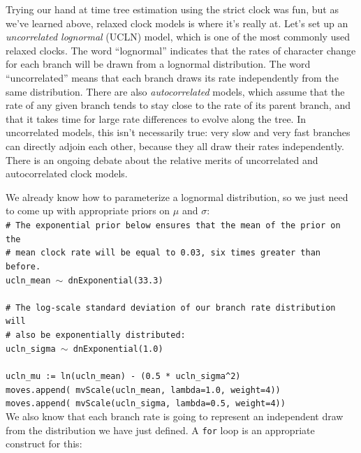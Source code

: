 \documentclass[12pt]{article}
\begin{document}
Trying our hand at time tree estimation using the strict clock was fun, but as we've learned above, relaxed clock models is where it's really at. Let's set up an \textit{uncorrelated lognormal} (UCLN) model, which is one of the most commonly used relaxed clocks. The word ``lognormal'' indicates that the rates of character change for each branch will be drawn from a lognormal distribution. The word ``uncorrelated'' means that each branch draws its rate independently from the same distribution. There are also \textit{autocorrelated} models, which assume that the rate of any given branch tends to stay close to the rate of its parent branch, and that it takes time for large rate differences to evolve along the tree. In uncorrelated models, this isn't necessarily true: very slow and very fast branches can directly adjoin each other, because they all draw their rates independently. There is an ongoing debate about the relative merits of uncorrelated and autocorrelated clock models.

\noindent We already know how to parameterize a lognormal distribution, so we just need to come up with appropriate priors on $\mu$ and $\sigma$: \\

\indent \texttt{\# The exponential prior below ensures that the mean of the prior on the} \\
\indent \texttt{\# mean clock rate will be equal to 0.03, six times greater than before.} \\
\indent \texttt{ucln\_mean {\footnotesize $\sim$} dnExponential(33.3)} \\
\ \\
\indent \texttt{\# The log-scale standard deviation of our branch rate distribution will} \\
\indent \texttt{\# also be exponentially distributed:} \\
\indent \texttt{ucln\_sigma {\footnotesize $\sim$} dnExponential(1.0)} \\
\ \\
\indent \texttt{ucln\_mu := ln(ucln\_mean) - (0.5 * ucln\_sigma\textasciicircum 2)} \\
\indent \texttt{moves.append( mvScale(ucln\_mean, lambda=1.0, weight=4))} \\
\indent \texttt{moves.append( mvScale(ucln\_sigma, lambda=0.5, weight=4))} \\

\noindent We also know that each branch rate is going to represent an independent draw from the distribution we have just defined. A \texttt{for} loop is an appropriate construct for this: \\
\end{document}
